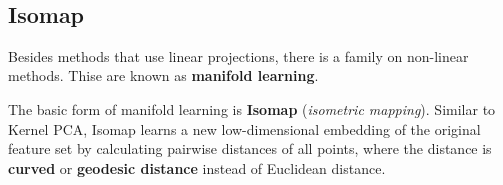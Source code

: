 \documentclass[11pt]{article}
\begin{document}
    \begin{center}
    \end{center}
    { \hspace*{\fill} \\}
    
    \subsection{Isomap}\label{isomap}

Besides methods that use linear projections, there is a family on
non-linear methods. Thise are known as \textbf{manifold learning}.

The basic form of manifold learning is \textbf{Isomap} (\emph{isometric
mapping}). Similar to Kernel PCA, Isomap learns a new low-dimensional
embedding of the original feature set by calculating pairwise distances
of all points, where the distance is \textbf{curved} or \textbf{geodesic
distance} instead of Euclidean distance.
\end{document}
